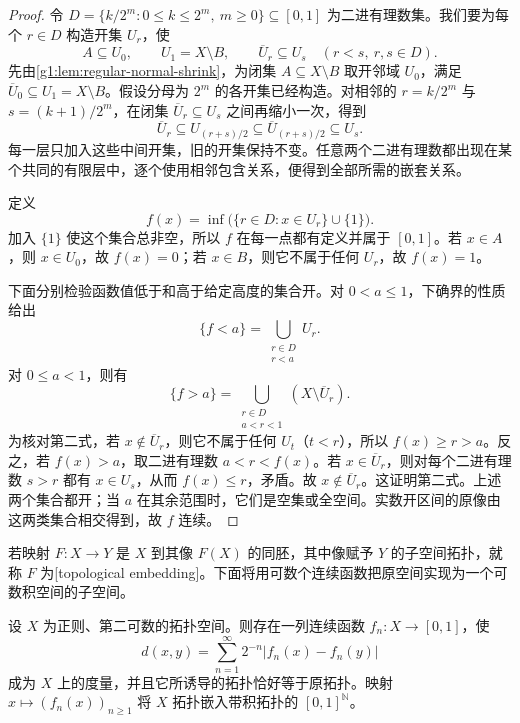 \begin{proof}
	令 \(D=\{k/2^m:0\le k\le2^m,\ m\ge0\}\subseteq[0,1]\) 为二进有理数集。我们要为每个 \(r\in D\) 构造开集 \(U_r\)，使
	\[
		A\subseteq U_0,\qquad U_1=X\setminus B,\qquad
		\overline U_r\subseteq U_s\quad(r<s,\ r,s\in D).
	\]
	先由\cref{g1:lem:regular-normal-shrink}，为闭集 \(A\subseteq X\setminus B\) 取开邻域 \(U_0\)，满足 \(\overline U_0\subseteq U_1=X\setminus B\)。假设分母为 \(2^m\) 的各开集已经构造。对相邻的 \(r=k/2^m\) 与 \(s=(k+1)/2^m\)，在闭集 \(\overline U_r\subseteq U_s\) 之间再缩小一次，得到
	\[
		\overline U_r\subseteq U_{(r+s)/2}
		\subseteq\overline U_{(r+s)/2}\subseteq U_s.
	\]
	每一层只加入这些中间开集，旧的开集保持不变。任意两个二进有理数都出现在某个共同的有限层中，逐个使用相邻包含关系，便得到全部所需的嵌套关系。

	定义
	\[
		f(x)=\inf\bigl(\{r\in D:x\in U_r\}\cup\{1\}\bigr).
	\]
	加入 \(\{1\}\) 使这个集合总非空，所以 \(f\) 在每一点都有定义并属于 \([0,1]\)。若 \(x\in A\)，则 \(x\in U_0\)，故 \(f(x)=0\)；若 \(x\in B\)，则它不属于任何 \(U_r\)，故 \(f(x)=1\)。

	下面分别检验函数值低于和高于给定高度的集合开。对 \(0<a\le1\)，下确界的性质给出
	\[
		\{f<a\}=\bigcup_{\substack{r\in D\\r<a}}U_r.
	\]
	对 \(0\le a<1\)，则有
	\[
		\{f>a\}=\bigcup_{\substack{r\in D\\a<r<1}}(X\setminus\overline U_r).
	\]
	为核对第二式，若 \(x\notin\overline U_r\)，则它不属于任何 \(U_t\)（\(t<r\)），所以 \(f(x)\ge r>a\)。反之，若 \(f(x)>a\)，取二进有理数 \(a<r<f(x)\)。若 \(x\in\overline U_r\)，则对每个二进有理数 \(s>r\) 都有 \(x\in U_s\)，从而 \(f(x)\le r\)，矛盾。故 \(x\notin\overline U_r\)。这证明第二式。上述两个集合都开；当 \(a\) 在其余范围时，它们是空集或全空间。实数开区间的原像由这两类集合相交得到，故 \(f\) 连续。
\end{proof}

若映射 \(F:X\to Y\) 是 \(X\) 到其像 \(F(X)\) 的同胚，其中像赋予 \(Y\) 的子空间拓扑，就称 \(F\) 为[topological embedding]。下面将用可数个连续函数把原空间实现为一个可数积空间的子空间。

\begin{theorem}\label{g1:thm:urysohn-metrization}
	设 \(X\) 为正则、第二可数的拓扑空间。则存在一列连续函数 \(f_n:X\to[0,1]\)，使
	\begin{equation}\label{g1:eq:urysohn-metric}
		d(x,y)=\sum_{n=1}^{\infty}2^{-n}|f_n(x)-f_n(y)|
	\end{equation}
	成为 \(X\) 上的度量，并且它所诱导的拓扑恰好等于原拓扑。映射 \(x\mapsto(f_n(x))_{n\ge1}\) 将 \(X\) 拓扑嵌入带积拓扑的 \([0,1]^{\mathbb N}\)。
\end{theorem}

